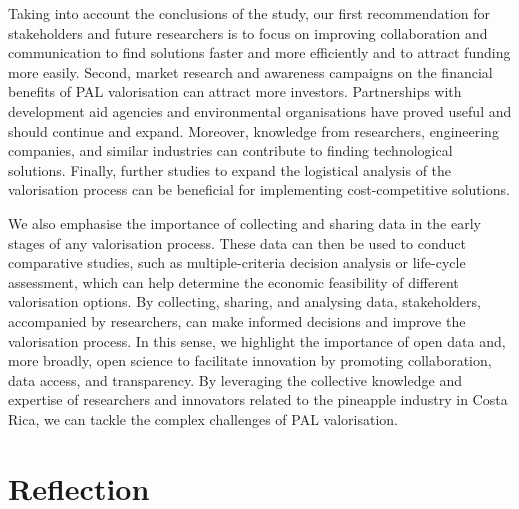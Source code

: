Taking into account the conclusions of the study, our first recommendation for stakeholders and future researchers is to focus on improving collaboration and communication to find solutions faster and more efficiently and to attract funding more easily. Second, market research and awareness campaigns on the financial benefits of PAL valorisation can attract more investors. Partnerships with development aid agencies and environmental organisations have proved useful and should continue and expand. Moreover, knowledge from researchers, engineering companies, and similar industries can contribute to finding technological solutions. Finally, further studies to expand the logistical analysis of the valorisation process can be beneficial for implementing cost-competitive solutions.

We also emphasise the importance of collecting and sharing data in the early stages of any valorisation process. These data can then be used to conduct comparative studies, such as multiple-criteria decision analysis or life-cycle assessment, which can help determine the economic feasibility of different valorisation options. By collecting, sharing, and analysing data, stakeholders, accompanied by researchers, can make informed decisions and improve the valorisation process. In this sense, we highlight the importance of open data and, more broadly, open science to facilitate innovation by promoting collaboration, data access, and transparency. By leveraging the collective knowledge and expertise of researchers and innovators related to the pineapple industry in Costa Rica, we can tackle the complex challenges of PAL valorisation.

\section{Reflection}

